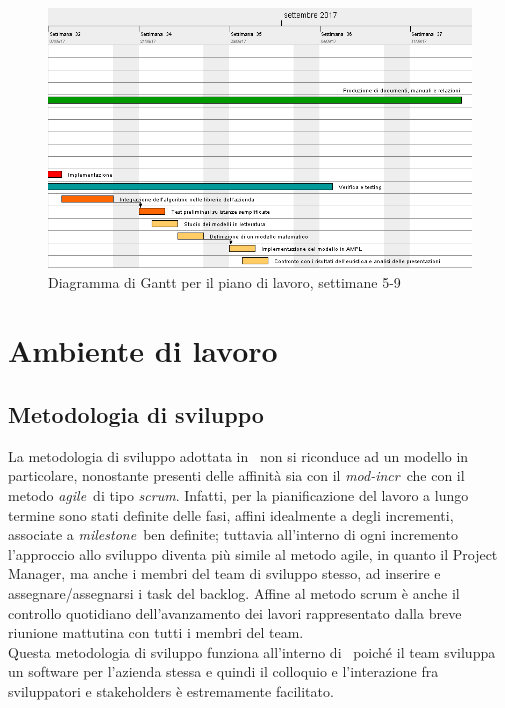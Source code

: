 \begin{figure}[!h]
    \begin{widepage}
    \includegraphics[width=14.9cm,keepaspectratio]{../immagini/pdp_2.png}
    \caption{Diagramma di Gantt per il piano di lavoro, settimane 5-9}
    \end{widepage}
\end{figure}

\clearpage
\section{Ambiente di lavoro}
    \subsection{Metodologia di sviluppo}
    La metodologia di sviluppo adottata in \TS\ non si riconduce ad un modello in particolare, nonostante presenti delle affinità sia con il \emph{\gls{mod-incr}}\glsfirstoccur\ che con il metodo \emph{\gls{agile}}\glsfirstoccur\ di tipo \emph{\gls{scrum}}\glsfirstoccur. Infatti, per la pianificazione del lavoro a lungo termine sono stati definite delle fasi, affini idealmente a degli incrementi, associate a \emph{\gls{milestone}}\glsfirstoccur\ ben definite; tuttavia all'interno di ogni incremento l'approccio allo sviluppo diventa più simile al metodo agile, in quanto il Project Manager, ma anche i membri del team di sviluppo stesso, ad inserire e assegnare/assegnarsi i task del backlog. Affine al metodo scrum è anche il controllo quotidiano dell'avanzamento dei lavori rappresentato dalla breve riunione mattutina con tutti i membri del team. \\
    Questa metodologia di sviluppo funziona all'interno di \TS\ poiché il team sviluppa un software per l'azienda stessa e quindi il colloquio e l'interazione fra sviluppatori e stakeholders è estremamente facilitato.

